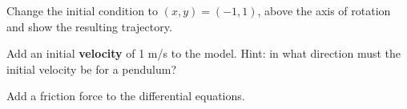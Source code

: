 \vfill


\problem Change the initial condition to $(x,y) = (-1, 1)$, above the
  axis of rotation and show the resulting trajectory.

\vsc
\vfill

\problem Add an initial {\bf velocity} of 1 m/s to the model.  Hint:
  in what direction must the initial velocity be for a pendulum? 

\vsc
\vfill

\problem Add a friction force to the differential equations.

\vsc
\vfill





